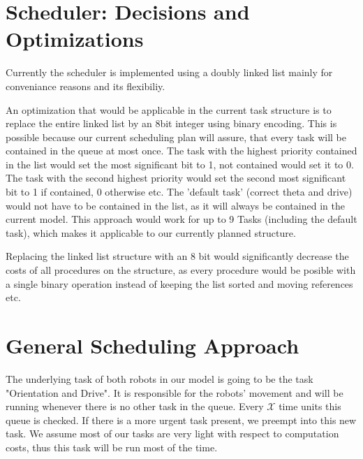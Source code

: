 \documentclass[12pt]{article}
\begin{document}
\lstset{language=C++}


\section*{Scheduler: Decisions and Optimizations}
Currently the scheduler is implemented using a doubly linked list mainly for conveniance reasons and its flexibiliy.

An optimization that would be applicable in the current task structure is to replace the entire linked list by an 8bit integer using binary encoding. This is possible because our current scheduling plan will assure, that every task will be contained in the queue at most once. The task with the highest priority contained in the list would set the most significant bit to 1, not contained would set it to 0. The task with the second highest priority would set the second most significant bit to 1 if contained, 0 otherwise etc. The 'default task' (correct theta and drive) would not have to be contained in the list, as it will always be contained in the current model. This approach would work for up to 9 Tasks (including the default task), which makes it applicable to our currently planned structure.

Replacing the linked list structure with an 8 bit would significantly decrease the costs of all procedures on the structure, as every procedure would be posible with a single binary operation instead of keeping the list sorted and moving references etc.

\section*{General Scheduling Approach}
The underlying task of both robots in our model is going to be the task "Orientation and Drive". It is responsible for the robots' movement and will be running whenever there is no other task in the queue. Every $\mathcal{X}$ time units this queue is checked. If there is a more urgent task present, we preempt into this new task. We assume most of our tasks are very light with respect to computation costs, thus this task will be run most of the time.

\newpage
\end{document}
